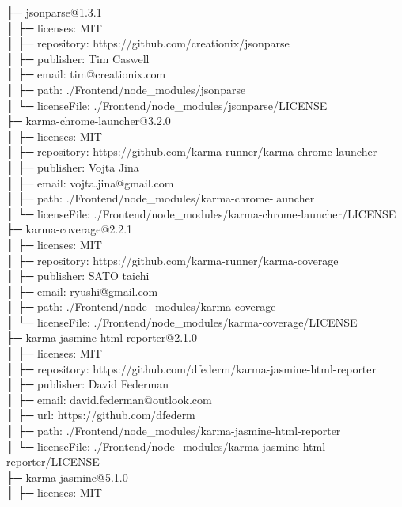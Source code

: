 ├─ jsonparse@1.3.1\\
│  ├─ licenses: MIT\\
│  ├─ repository: https://github.com/creationix/jsonparse\\
│  ├─ publisher: Tim Caswell\\
│  ├─ email: tim@creationix.com\\
│  ├─ path: ./Frontend/node\_modules/jsonparse\\
│  └─ licenseFile: ./Frontend/node\_modules/jsonparse/LICENSE\\
├─ karma-chrome-launcher@3.2.0\\
│  ├─ licenses: MIT\\
│  ├─ repository: https://github.com/karma-runner/karma-chrome-launcher\\
│  ├─ publisher: Vojta Jina\\
│  ├─ email: vojta.jina@gmail.com\\
│  ├─ path: ./Frontend/node\_modules/karma-chrome-launcher\\
│  └─ licenseFile: ./Frontend/node\_modules/karma-chrome-launcher/LICENSE\\
├─ karma-coverage@2.2.1\\
│  ├─ licenses: MIT\\
│  ├─ repository: https://github.com/karma-runner/karma-coverage\\
│  ├─ publisher: SATO taichi\\
│  ├─ email: ryushi@gmail.com\\
│  ├─ path: ./Frontend/node\_modules/karma-coverage\\
│  └─ licenseFile: ./Frontend/node\_modules/karma-coverage/LICENSE\\
├─ karma-jasmine-html-reporter@2.1.0\\
│  ├─ licenses: MIT\\
│  ├─ repository: https://github.com/dfederm/karma-jasmine-html-reporter\\
│  ├─ publisher: David Federman\\
│  ├─ email: david.federman@outlook.com\\
│  ├─ url: https://github.com/dfederm\\
│  ├─ path: ./Frontend/node\_modules/karma-jasmine-html-reporter\\
│  └─ licenseFile: ./Frontend/node\_modules/karma-jasmine-html-reporter/LICENSE\\
├─ karma-jasmine@5.1.0\\
│  ├─ licenses: MIT\\
